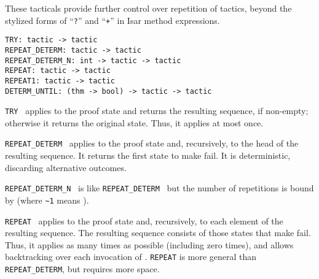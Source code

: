 \begin{isabellebody}
\begin{isamarkuptext}
\begin{description}
  \end{description}%
\end{isamarkuptext}%
\isamarkuptrue%
%
\endisatagmlref
{\isafoldmlref}%
%
\isadelimmlref
%
\endisadelimmlref
%
\isamarkuptrue%
%
\begin{isamarkuptext}%
These tacticals provide further control over repetition of
  tactics, beyond the stylized forms of ``\verb|?|''  and
  ``\verb|+|'' in Isar method expressions.%
\end{isamarkuptext}%
\isamarkuptrue%
%
\isadelimmlref
%
\endisadelimmlref
%
\isatagmlref
%
\begin{isamarkuptext}%
\begin{mldecls}
  \verb|TRY: tactic -> tactic| \\
  \verb|REPEAT_DETERM: tactic -> tactic| \\
  \verb|REPEAT_DETERM_N: int -> tactic -> tactic| \\
  \verb|REPEAT: tactic -> tactic| \\
  \verb|REPEAT1: tactic -> tactic| \\
  \verb|DETERM_UNTIL: (thm -> bool) -> tactic -> tactic| \\
  \end{mldecls}

  \begin{description}

  \item \verb|TRY|~ applies  to the proof
  state and returns the resulting sequence, if non-empty; otherwise it
  returns the original state.  Thus, it applies  at most
  once.

  \item \verb|REPEAT_DETERM|~ applies  to the
  proof state and, recursively, to the head of the resulting sequence.
  It returns the first state to make  fail.  It is
  deterministic, discarding alternative outcomes.

  \item \verb|REPEAT_DETERM_N|~ is like \verb|REPEAT_DETERM|~ but the number of repetitions is bound
  by  (where \verb|~1| means ).

  \item \verb|REPEAT|~ applies  to the proof
  state and, recursively, to each element of the resulting sequence.
  The resulting sequence consists of those states that make  fail.  Thus, it applies  as many times as
  possible (including zero times), and allows backtracking over each
  invocation of .  \verb|REPEAT| is more general than \verb|REPEAT_DETERM|, but requires more space.


\end{description}
\end{isamarkuptext}
\end{isabellebody}
